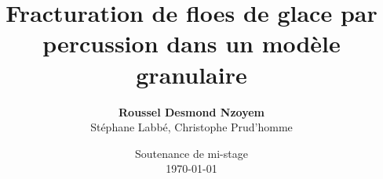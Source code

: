 \documentclass[notes,handout,compress]{beamer}
\begin{document}

\title[\textsc{Fracturation de floes de glace}]{\LARGE Fracturation de floes de glace par percussion dans un modèle granulaire}

\author[Roussel Desmond Nzoyem]{\large \textbf{Roussel Desmond Nzoyem} \\ \vspace*{0.15cm} \small Stéphane Labbé, Christophe Prud'homme}



\date[Soutenance de mi-stage 2021]{Soutenance de mi-stage\\\today}


\begingroup



  \begin{frame}[fragile]
    \vspace*{1.0cm}
    \maketitle
  \end{frame}
\endgroup
\end{document}
